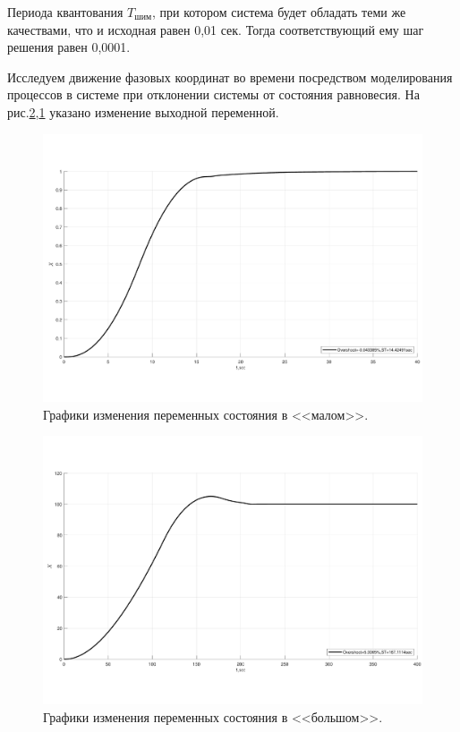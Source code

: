 Периода квантования $T_{\text{шим}}$, при котором система будет обладать теми же качествами, что и 
исходная равен 0,01 сек. Тогда соответствующий ему шаг решения равен 0,0001.  

Исследуем движение фазовых координат во времени посредством моделирования процессов в системе при отклонении системы от состояния равновесия. 
На рис.\ref{fig:final_VSS_PWM_sv_DCS_bol},\ref{fig:final_VSS_PWM_sv_DCS_mal} указано изменение выходной переменной. 
\begin{figure}[!h]\centering
	\includegraphics[width=1\linewidth]{images/final_VSS_PWM_sv_DCS_mal}
	\caption{ Графики изменения переменных состояния в <<малом>>.}\label{fig:final_VSS_PWM_sv_DCS_mal}
\end{figure}
\begin{figure}[!h]\centering
	\includegraphics[width=1\linewidth]{images/final_VSS_PWM_sv_DCS_bol}
	\caption{ Графики изменения переменных состояния в <<большом>>.}\label{fig:final_VSS_PWM_sv_DCS_bol}
\end{figure}
